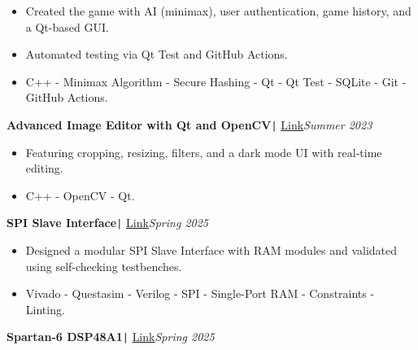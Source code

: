\documentclass[11pt,a4paper]{article}
\begin{document}
\vspace{-0.7cm}
\begin{itemize}
\item \setlength{\itemsep}{-0.0em} Created the game with AI (minimax), user authentication, game history, and a Qt-based GUI.
\item \setlength{\itemsep}{-0.0em} Automated testing via Qt Test and GitHub Actions.
\item \setlength{\itemsep}{-0.0em} C++ - Minimax Algorithm - Secure Hashing - Qt - Qt Test - SQLite - Git - GitHub Actions.
\end{itemize}
\vspace{-0.5cm}
\newpage
\begin{flushleft}
\textbf{Advanced Image Editor with Qt and OpenCV}\texttt{|} {\href{https://github.com/salah0eldin/CODSOFT/tree/main/C%2B%2B/Task5%20-%20ImageProcessing/ImageEdit}{Link}}\hfill\textit{Summer 2023}\\
\end{flushleft}
\vspace{-0.7cm}
\begin{itemize}
\item \setlength{\itemsep}{-0.0em} Featuring cropping, resizing, filters, and a dark mode UI with real-time editing.
\item \setlength{\itemsep}{-0.0em} C++ - OpenCV - Qt.
\end{itemize}
\vspace{-0.5cm}
\begin{flushleft}
\textbf{SPI Slave Interface}\texttt{|} {\href{https://github.com/salah0eldin/Digital-Projects/tree/master/SPI_Slave_Interface}{Link}}\hfill\textit{Spring 2025}\\
\end{flushleft}
\vspace{-0.7cm}
\begin{itemize}
\item \setlength{\itemsep}{-0.0em} Designed a modular SPI Slave Interface with RAM modules and validated using self-checking testbenches.
\item \setlength{\itemsep}{-0.0em} Vivado - Questasim - Verilog - SPI - Single-Port RAM - Constraints - Linting.
\end{itemize}
\vspace{-0.5cm}
\begin{flushleft}
\textbf{Spartan-6 DSP48A1}\texttt{|} {\href{https://github.com/salah0eldin/Digital-Projects/tree/master/DSP48A1}{Link}}\hfill\textit{Spring 2025}\\
\end{flushleft}
\end{document}
